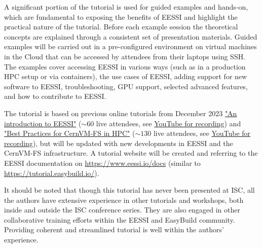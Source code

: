 A significant portion of the tutorial is used for guided examples and hands-on,
which are fundamental to exposing the benefits of EESSI and highlight the practical nature of the tutorial.
Before each example session the theoretical concepts are explained through a consistent set of presentation materials.
Guided examples will be carried out in a pre-configured environment on virtual machines in the Cloud that can be
accessed by
attendees from their laptops using SSH. 
The examples cover accessing EESSI in various ways (such as in a production HPC setup or via
containers), the use cases of EESSI, adding support for new software to EESSI, troubleshooting, GPU support, selected
advanced features, and how to contribute to EESSI.

The tutorial is based on previous online tutorials from December 2023
\href{https://raw.githubusercontent.com/eessi/docs/main/talks/20231205-Introduction-to-EESSI-CASTIEL2/20231205-Introduction-to-EESSI-CASTIEL2.pdf}{"An introduction to EESSI"} ($\sim60$ live attendees, see \href{https://www.youtube.com/watch?v=KAYI9oKFLxA}{YouTube for recording}) and
\href{https://raw.githubusercontent.com/multixscale/cvmfs-tutorial-hpc-best-practices/main/files/Best-Practices-for-CernVM-FS-in-HPC-20231204.pdf}{"Best Practices for CernVM-FS in HPC"} ($\sim130$ live attendees, see \href{https://www.youtube.com/watch?v=L0Mmy7NBXDU}{YouTube for recording}),
but will be updated with new developments in EESSI and the CernVM-FS infrastructure.
A tutorial website will be created and referring to the EESSI documentation on
\href{https://www.eessi.io/docs}{https://www.eessi.io/docs} (similar to \href{https://tutorial.easybuild.io/}{https://tutorial.easybuild.io/}).

It should be noted that though this tutorial has never been presented at ISC, all the authors have extensive
experience in other tutorials and workshops, both inside and outside the ISC conference series.
They are also engaged in other collaborative training efforts within the EESSI and EasyBuild community. Providing coherent and streamlined
tutorial is well within the authors' experience.




